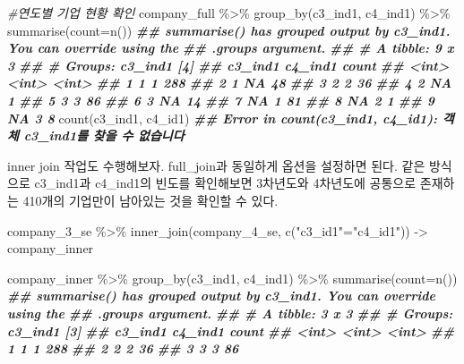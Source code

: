 \documentclass[
]{book}
\newenvironment{Shaded}{\begin{snugshade}}{\end{snugshade}}
\newcommand{\AttributeTok}[1]{\textcolor[rgb]{0.77,0.63,0.00}{#1}}
\newcommand{\CommentTok}[1]{\textcolor[rgb]{0.56,0.35,0.01}{\textit{#1}}}
\newcommand{\DocumentationTok}[1]{\textcolor[rgb]{0.56,0.35,0.01}{\textbf{\textit{#1}}}}
\newcommand{\FunctionTok}[1]{\textcolor[rgb]{0.00,0.00,0.00}{#1}}
\newcommand{\NormalTok}[1]{#1}
\newcommand{\OtherTok}[1]{\textcolor[rgb]{0.56,0.35,0.01}{#1}}
\newcommand{\SpecialCharTok}[1]{\textcolor[rgb]{0.00,0.00,0.00}{#1}}
\newcommand{\StringTok}[1]{\textcolor[rgb]{0.31,0.60,0.02}{#1}}
\theoremstyle{definition}
\theoremstyle{definition}
\theoremstyle{definition}
\theoremstyle{definition}
\theoremstyle{remark}
\begin{document}
\begin{Shaded}
\begin{Highlighting}[]
\CommentTok{\#연도별 기업 현황 확인}
\NormalTok{company\_full }\SpecialCharTok{\%\textgreater{}\%} 
  \FunctionTok{group\_by}\NormalTok{(c3\_ind1, c4\_ind1) }\SpecialCharTok{\%\textgreater{}\%} 
  \FunctionTok{summarise}\NormalTok{(}\AttributeTok{count=}\FunctionTok{n}\NormalTok{())}
\DocumentationTok{\#\# \textasciigrave{}summarise()\textasciigrave{} has grouped output by \textquotesingle{}c3\_ind1\textquotesingle{}. You can override using the}
\DocumentationTok{\#\# \textasciigrave{}.groups\textasciigrave{} argument.}
\DocumentationTok{\#\# \# A tibble: 9 x 3}
\DocumentationTok{\#\# \# Groups:   c3\_ind1 [4]}
\DocumentationTok{\#\#   c3\_ind1 c4\_ind1 count}
\DocumentationTok{\#\#     \textless{}int\textgreater{}   \textless{}int\textgreater{} \textless{}int\textgreater{}}
\DocumentationTok{\#\# 1       1       1   288}
\DocumentationTok{\#\# 2       1      NA    48}
\DocumentationTok{\#\# 3       2       2    36}
\DocumentationTok{\#\# 4       2      NA     1}
\DocumentationTok{\#\# 5       3       3    86}
\DocumentationTok{\#\# 6       3      NA    14}
\DocumentationTok{\#\# 7      NA       1    81}
\DocumentationTok{\#\# 8      NA       2     1}
\DocumentationTok{\#\# 9      NA       3     8}
  \FunctionTok{count}\NormalTok{(c3\_ind1, c4\_id1)}
\DocumentationTok{\#\# Error in count(c3\_ind1, c4\_id1): 객체 \textquotesingle{}c3\_ind1\textquotesingle{}를 찾을 수 없습니다}
\end{Highlighting}
\end{Shaded}

inner join 작업도 수행해보자. full\_join과 동일하게 옵션을 설정하면 된다. 같은 방식으로 c3\_ind1과 c4\_ind1의 빈도를 확인해보면 3차년도와 4차년도에 공통으로 존재하는 410개의 기업만이 남아있는 것을 확인할 수 있다.

\begin{Shaded}
\begin{Highlighting}[]
\NormalTok{company\_3\_se }\SpecialCharTok{\%\textgreater{}\%} 
  \FunctionTok{inner\_join}\NormalTok{(company\_4\_se, }\FunctionTok{c}\NormalTok{(}\StringTok{"c3\_id1"}\OtherTok{=}\StringTok{"c4\_id1"}\NormalTok{)) }\OtherTok{{-}\textgreater{}}\NormalTok{ company\_inner}

\NormalTok{company\_inner }\SpecialCharTok{\%\textgreater{}\%} 
  \FunctionTok{group\_by}\NormalTok{(c3\_ind1, c4\_ind1) }\SpecialCharTok{\%\textgreater{}\%} 
  \FunctionTok{summarise}\NormalTok{(}\AttributeTok{count=}\FunctionTok{n}\NormalTok{())}
\DocumentationTok{\#\# \textasciigrave{}summarise()\textasciigrave{} has grouped output by \textquotesingle{}c3\_ind1\textquotesingle{}. You can override using the}
\DocumentationTok{\#\# \textasciigrave{}.groups\textasciigrave{} argument.}
\DocumentationTok{\#\# \# A tibble: 3 x 3}
\DocumentationTok{\#\# \# Groups:   c3\_ind1 [3]}
\DocumentationTok{\#\#   c3\_ind1 c4\_ind1 count}
\DocumentationTok{\#\#     \textless{}int\textgreater{}   \textless{}int\textgreater{} \textless{}int\textgreater{}}
\DocumentationTok{\#\# 1       1       1   288}
\DocumentationTok{\#\# 2       2       2    36}
\DocumentationTok{\#\# 3       3       3    86}
\end{Highlighting}
\end{Shaded}
\end{document}
